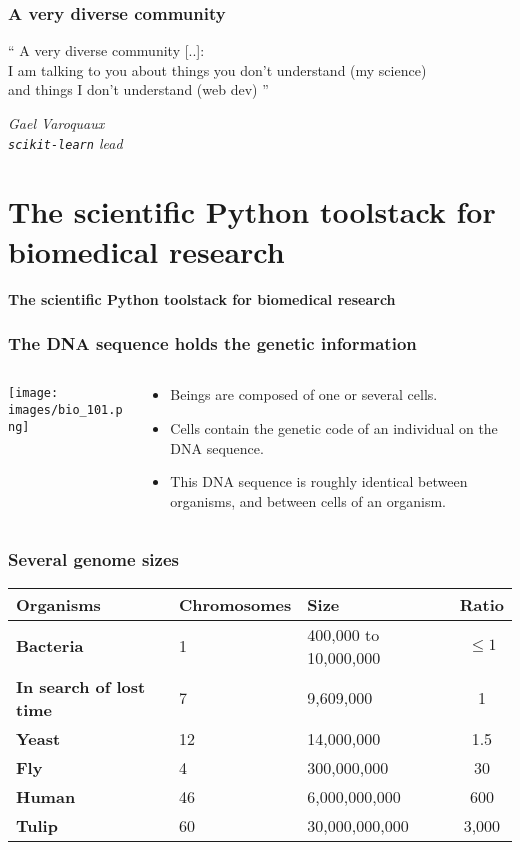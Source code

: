\documentclass[xcolor=dvipsnames]{beamer}
\begin{document}
\begin{frame}
\frametitle{A very diverse community}

{\Large ``
A very diverse community [..]: \\
I am talking to you about things you don't understand (my science) \\
and things I don't understand (web dev)
''}
\begin{flushright}
\em Gael Varoquaux \\
\texttt{scikit-learn} lead
\end{flushright}
\end{frame}


\section{The scientific Python toolstack for biomedical research}
\begin{frame}
\Large{ \bf
The scientific Python toolstack for biomedical research}

\end{frame}

\begin{frame}
\frametitle{The DNA sequence holds the genetic information}
\begin{columns}
\begin{column}{0.45\linewidth}
\texttt{[image: images/bio\_101.png]}
\end{column}
\begin{column}{0.45\linewidth}
\begin{itemize}[label={$\bullet$}]
\item Beings are composed of one or several cells.
\item Cells contain the genetic code of an individual on the DNA sequence.
\item This DNA sequence is roughly identical between organisms, and between
cells of an organism.
\end{itemize}
\end{column}
\end{columns}
\end{frame}

\begin{frame}
\frametitle{Several genome sizes}

\begin{table}
\footnotesize
\begin{tabular}{l | l | l | c}
{\bf Organisms} &{\bf Chromosomes} & {\bf Size} & {\bf Ratio} \\
\hline
{\bf Bacteria} & 1 & 400,000 to 10,000,000 & $\leq 1$ \\
{\color{Blue} \bf In search of lost time} & 7 & 9,609,000 & 1\\
{\bf Yeast} & 12 & 14,000,000 & 1.5 \\
{\bf Fly} & 4 & 300,000,000 & 30 \\
{\bf Human} & 46 & 6,000,000,000 & 600 \\
{\bf Tulip} & 60 & 30,000,000,000 & 3,000 \\
\end{tabular}
\end{table}
\end{frame}
\end{document}
